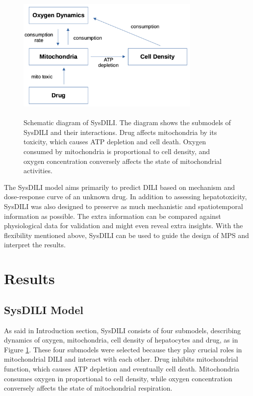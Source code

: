 \documentclass[12pt]{article}
\begin{document}
\begin{figure}[h!]
\centering
\includegraphics[width = 9cm, height = 6.5cm]{overall.png}
\caption{Schematic diagram of SysDILI. The diagram shows the submodels of SysDILI and their interactions. Drug affects mitochondria by its toxicity, which causes ATP depletion and cell death. Oxygen consumed by mitochondria is proportional to cell density, and oxygen concentration conversely affects the state of mitochondrial activities.}
\label{fig:1}
\end{figure}
The SysDILI model aims primarily to predict DILI based on mechanism and dose-response curve of an unknown drug. In addition to assessing hepatotoxicity, SysDILI was also designed to preserve as much mechanistic and spatiotemporal information as possible. The extra information can be compared against physiological data for validation and might even reveal extra insights. With the flexibility mentioned above, SysDILI can be used to guide the design of MPS and interpret the results.
\section{Results}
\subsection{SysDILI Model}
As said in Introduction section, SysDILI consists of four submodels, describing dynamics of oxygen, mitochondria, cell density of hepatocytes and drug, as in Figure \ref{fig:1}. These four submodels were selected because they play crucial roles in mitochondrial DILI and interact with each other. Drug inhibits mitochondrial function, which causes ATP depletion and eventually cell death. Mitochondria consumes oxygen in proportional to cell density, while oxygen concentration conversely affects the state of mitochondrial respiration.
\end{document}
